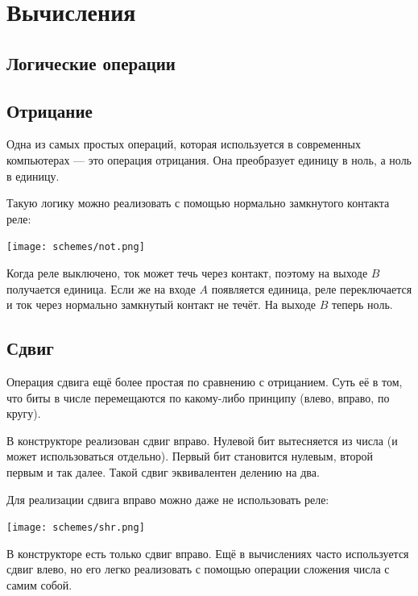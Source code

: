 
\chapter{Вычисления}

\section{Логические операции}

\section{Отрицание}

Одна из самых простых операций, которая используется в современных
компьютерах --- это операция отрицания. Она преобразует единицу
в ноль, а ноль в единицу.

Такую логику можно реализовать с помощью нормально замкнутого контакта реле:

\begin{center}
\texttt{[image: schemes/not.png]}
\end{center}

Когда реле выключено, ток может течь через контакт, поэтому на выходе $B$
получается единица. Если же на входе $A$ появляется единица, реле переключается
и ток через нормально замкнутый контакт не течёт. На выходе $B$ теперь ноль.

\section{Сдвиг}

Операция сдвига ещё более простая по сравнению с отрицанием.
Суть её в том, что биты в числе перемещаются по какому-либо
принципу (влево, вправо, по кругу).

В конструкторе реализован сдвиг вправо.
Нулевой бит вытесняется из числа (и может использоваться отдельно).
Первый бит становится нулевым, второй первым и так далее.
Такой сдвиг эквивалентен делению на два.

Для реализации сдвига вправо можно даже не использовать реле:

\begin{center}
\texttt{[image: schemes/shr.png]}
\end{center}

В конструкторе есть только сдвиг вправо. Ещё в вычислениях часто используется
сдвиг влево, но его легко реализовать с помощью операции сложения
числа с самим собой.

